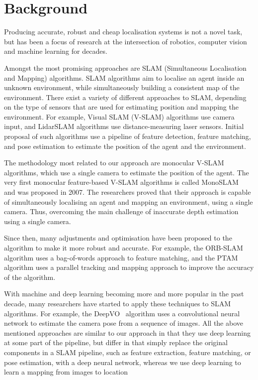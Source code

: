 \documentclass{article}
\begin{document}

  \section{Background} %
  \label{sec:background}


  Producing accurate, robust and cheap localisation systems is not a novel task,
  but has been a focus of research at the intersection of robotics, computer
  vision and machine learning for decades.

  Amongst the most promising approaches are SLAM (Simultaneous Localisation and
  Mapping) algorithms. SLAM algorithms aim to localise an agent inside an
  unknown environment, while simultaneously building a consistent map of the
  environment. There exist a variety of different approaches to SLAM, depending
  on the type of sensors that are used for estimating position and mapping the
  environment. For example, Visual SLAM (V-SLAM) algorithms use camera input,
  and LidarSLAM algorithms use distance-measuring laser sensors.
  Initial proposal of such algorithms use a pipeline of feature detection, 
  feature matching, and pose estimation to estimate the position of the agent
  and the environment. 

  The methodology most related to our approach are monocular V-SLAM algorithms,
  which use a single camera to estimate the position of the agent. The very
  first monocular feature-based V-SLAM algorithms is called
  MonoSLAM~\cite{mono-slam} and was proposed in 2007. The researchers proved
  that their approach is capable of simultaneously localising an agent and
  mapping an environment, using a single camera. Thus, overcoming the main
  challenge of inaccurate depth estimation using a single camera.

  Since then, many adjustments and optimisation have been proposed to the
  algorithm to make it more robust and accurate. For example, the
  ORB-SLAM~\cite{orb-slam} algorithm uses a bag-of-words approach to feature
  matching, and the PTAM~\cite{ptam} algorithm uses a parallel tracking and
  mapping approach to improve the accuracy of the algorithm. 

  With machine and deep learning becoming more and more popular in the past
  decade, many researchers have started to apply these techniques to SLAM
  algorithms. For example, the DeepVO~\cite{deep-vo} algorithm uses a
  convolutional neural network to estimate the camera pose from a sequence of
  images. All the above mentioned approaches are similar to our approach in that
  they use deep learning at some part of the pipeline, but differ in that simply
  replace the original components in a SLAM pipeline, such as feature
  extraction, feature matching, or pose estimation, with a deep neural network,
  whereas we use deep learning to learn a mapping from images to location
  
\end{document}

